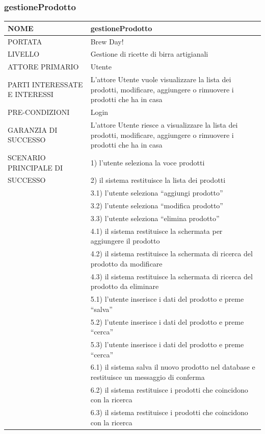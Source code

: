 \documentclass[a4paper, titlepage]{article}
\begin{document}
\subsubsection{gestioneProdotto}
\begin{longtable}{p{6cm}p{7cm}}\toprule
    NOME & gestioneProdotto\\\midrule
    PORTATA & Brew Day!\\\midrule
    LIVELLO & Gestione di ricette di birra artigianali\\\midrule
    ATTORE PRIMARIO & Utente\\\midrule
    PARTI INTERESSATE E INTERESSI & L’attore Utente vuole visualizzare la lista dei prodotti, modificare, aggiungere o rimuovere i prodotti che ha in casa\\\midrule
    PRE-CONDIZIONI & Login\\\midrule
    GARANZIA DI SUCCESSO &  L’attore Utente riesce a visualizzare la lista dei prodotti, modificare, aggiungere o rimuovere i prodotti che ha in casa\\\midrule
    SCENARIO PRINCIPALE DI
    & 1) l’utente seleziona la voce prodotti\\
    SUCCESSO & 2) il sistema restituisce la lista dei prodotti\\
    & 3.1) l’utente seleziona “aggiungi prodotto”\\
    & 3.2) l’utente seleziona “modifica prodotto”\\
    & 3.3) l’utente seleziona “elimina prodotto”\\
    & 4.1) il sistema restituisce la schermata per aggiungere il prodotto\\
    & 4.2) il sistema restituisce la schermata di ricerca del prodotto da modificare\\
    & 4.3) il sistema restituisce la schermata di ricerca del prodotto da eliminare\\
    & 5.1) l’utente inserisce i dati del prodotto e preme “salva”\\
    & 5.2) l’utente inserisce i dati del prodotto e preme “cerca”\\
    & 5.3) l’utente inserisce i dati del prodotto e preme “cerca”\\
    & 6.1) il sistema salva il nuovo prodotto nel database e restituisce un messaggio di conferma\\
    & 6.2) il sistema restituisce i prodotti che coincidono con la ricerca\\
    & 6.3) il sistema restituisce i prodotti che coincidono con la ricerca\\

\end{longtable}
\end{document}
